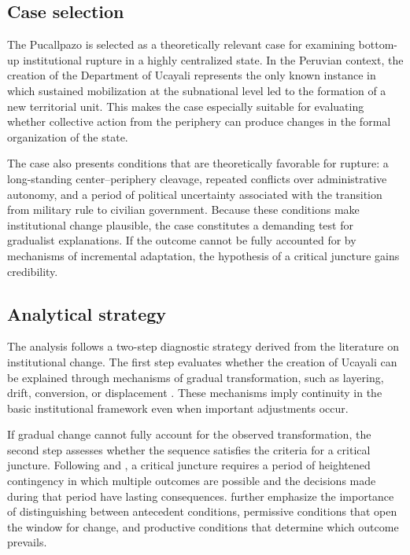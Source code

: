 \documentclass[12pt]{article}
\begin{document}
\subsection*{Case selection}

The Pucallpazo is selected as a theoretically relevant case for examining
bottom-up institutional rupture in a highly centralized state. In the
Peruvian context, the creation of the Department of Ucayali represents
the only known instance in which sustained mobilization at the subnational
level led to the formation of a new territorial unit. This makes the case
especially suitable for evaluating whether collective action from the
periphery can produce changes in the formal organization of the state.

The case also presents conditions that are theoretically favorable for
rupture: a long-standing center--periphery cleavage, repeated conflicts
over administrative autonomy, and a period of political uncertainty
associated with the transition from military rule to civilian government.
Because these conditions make institutional change plausible, the case
constitutes a demanding test for gradualist explanations. If the outcome
cannot be fully accounted for by mechanisms of incremental adaptation,
the hypothesis of a critical juncture gains credibility.

\subsection*{Analytical strategy}

The analysis follows a two-step diagnostic strategy derived from the
literature on institutional change. The first step evaluates whether the
creation of Ucayali can be explained through mechanisms of gradual
transformation, such as layering, drift, conversion, or displacement
\autocite{streeck_introduction_2005,mahoney_explaining_2010}. These mechanisms
imply continuity in the basic institutional framework even when important
adjustments occur.

If gradual change cannot fully account for the observed transformation,
the second step assesses whether the sequence satisfies the criteria for
a critical juncture. Following \textcite{collier_shaping_1991} and
\textcite{capoccia_study_2007}, a critical juncture requires a period
of heightened contingency in which multiple outcomes are possible and the
decisions made during that period have lasting consequences.
\textcite{slater_informative_2010} further emphasize the importance of
distinguishing between antecedent conditions, permissive conditions that
open the window for change, and productive conditions that determine
which outcome prevails.
\end{document}
